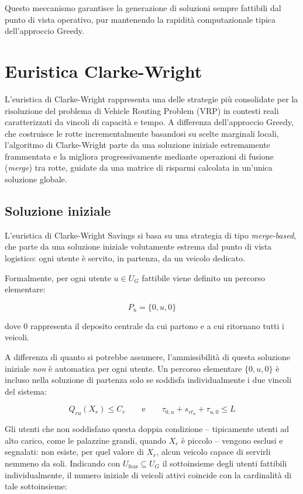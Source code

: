 Questo meccanismo garantisce la generazione di soluzioni sempre fattibili dal punto di vista operativo, pur mantenendo la rapidità computazionale tipica dell'approccio Greedy.

\section{Euristica Clarke-Wright}

L'euristica di Clarke-Wright rappresenta una delle strategie più consolidate per la risoluzione del problema di Vehicle Routing Problem (VRP) in contesti reali caratterizzati da vincoli di capacità e tempo. A differenza dell'approccio Greedy, che costruisce le rotte incrementalmente basandosi su scelte marginali locali, l'algoritmo di Clarke-Wright parte da una soluzione iniziale estremamente frammentata e la migliora progressivamente mediante operazioni di fusione (\emph{merge}) tra rotte, guidate da una matrice di risparmi calcolata in un'unica soluzione globale.

\subsection{Soluzione iniziale}

L'euristica di Clarke-Wright Savings si basa su una strategia di tipo \emph{merge-based}, che parte da una soluzione iniziale volutamente estrema dal punto di vista logistico: ogni utente è servito, in partenza, da un veicolo dedicato.

Formalmente, per ogni utente $u \in U_G$ fattibile viene definito un percorso elementare:

\[
P_u = \{0, u, 0\}
\]

dove $0$ rappresenta il deposito centrale da cui partono e a cui ritornano tutti i veicoli.

A differenza di quanto si potrebbe assumere, l'ammissibilità di questa soluzione iniziale \emph{non} è automatica per ogni utente. Un percorso elementare $\{0,u,0\}$ è incluso nella soluzione di partenza solo se soddisfa individualmente i due vincoli del sistema:

\[
Q_{ru}(X_r) \leq C_r \qquad \text{e} \qquad \tau_{0,u}+s_{r t_u}+\tau_{u,0} \leq L
\]

Gli utenti che non soddisfano questa doppia condizione -- tipicamente utenti ad alto carico, come le palazzine grandi, quando $X_r$ è piccolo -- vengono esclusi e segnalati: non esiste, per quel valore di $X_r$, alcun veicolo capace di servirli nemmeno da soli. Indicando con $U_{\text{feas}} \subseteq U_G$ il sottoinsieme degli utenti fattibili individualmente, il numero iniziale di veicoli attivi coincide con la cardinalità di tale sottoinsieme:

